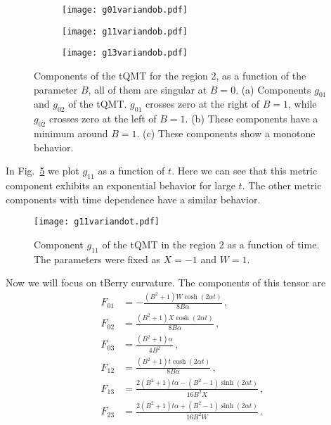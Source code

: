 \documentclass[12pt]{iopart}
\begin{document}
\begin{figure}[H]
 \centering
  \begin{subfigure}{0.32\linewidth}
    \texttt{[image: g01variandob.pdf]}
    \caption{}
    \label{fig:gvariandobc}
  \end{subfigure}
  \centering
  \begin{subfigure}{0.32\linewidth}
    \texttt{[image: g11variandob.pdf]}
    \caption{}
    \label{fig:gvariandoba}
  \end{subfigure}
  \begin{subfigure}{0.32\linewidth}
    \texttt{[image: g13variandob.pdf]}  
    \caption{}
    \label{fig:gvariandobb}  
  \end{subfigure}
  \captionsetup{font=small} 
  \caption{\justifying  Components of the tQMT for the region 2, as a function of the parameter $B$, all of them are singular at $B=0$. (a) Components $g_{01}$ and $g_{02}$ of the tQMT. $g_{01}$ crosses zero at the right of $B=1$, while $g_{02}$ crosses zero at the left of $B=1$. (b) These components have a minimum around $B=1$. (c) These components show a monotone behavior.}
\label{fig:gvariandobtodas}
\end{figure}


In Fig.~\ref{fig:g11variandot} we plot $g_{11}$ as a function of $t$. Here we can see that this metric component exhibits an exponential behavior for large $t$. The other metric components with time dependence have a similar behavior. 

\begin{figure}[H]
    \centering
{\texttt{[image: g11variandot.pdf]}}
    \captionsetup{font=small} 
    \caption{Component $g_{11}$ of the tQMT in the region 2 as a function of time. The parameters were fixed as $X=-1$ and $W=1$.}
\label{fig:g11variandot}
\end{figure}


Now we will focus on tBerry curvature. The components of this tensor are
\begin{subequations}
    \begin{align}
      F_{01}&=-\frac{\left(B^2+1\right) W \cosh \left(2  \alpha t \right)}{8 B \alpha}\,,\\      
      F_{02}&=\frac{\left(B^2+1\right) X \cosh \left(2 \alpha t \right)}{8 B \alpha} \,,\\     
      F_{03}&=\frac{\left(B^2+1\right) \alpha}{4 B^2}\, ,\\
      F_{12}&=\frac{\left(B^2+1\right) t \cosh \left(2  \alpha t \right)}{8 B \alpha}\,,\\
      F_{13}&=\frac{2 \left(B^2+1\right) t
   \alpha-\left(B^2-1\right) \sinh \left(2 \alpha t \right)}{16 B^2 X}\,,\\
      F_{23}&=\frac{2 \left(B^2+1\right) t
   \alpha +\left(B^2-1\right) \sinh \left(2 \alpha  t\right)}{16 B^2 W}\,.
    \end{align}
\end{subequations}
\end{document}
